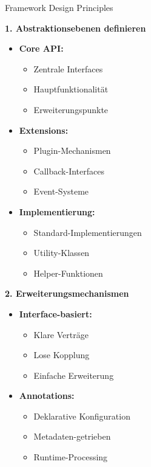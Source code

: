 \begin{corollary}{Framework Design Principles}

\begin{minipage}[t]{0.5\textwidth}
\textbf{1. Abstraktionsebenen definieren}
\begin{itemize}
    \item \textbf{Core API:}
    \begin{itemize}
        \item Zentrale Interfaces
        \item Hauptfunktionalität
        \item Erweiterungspunkte
    \end{itemize}
    
    \item \textbf{Extensions:}
    \begin{itemize}
        \item Plugin-Mechanismen
        \item Callback-Interfaces
        \item Event-Systeme
    \end{itemize}
    
    \item \textbf{Implementierung:}
    \begin{itemize}
        \item Standard-Implementierungen
        \item Utility-Klassen
        \item Helper-Funktionen
    \end{itemize}
\end{itemize}
\end{minipage}
\begin{minipage}[t]{0.5\textwidth}
\textbf{2. Erweiterungsmechanismen}
\begin{itemize}
    \item \textbf{Interface-basiert:}
    \begin{itemize}
        \item Klare Verträge
        \item Lose Kopplung
        \item Einfache Erweiterung
    \end{itemize}
    
    \item \textbf{Annotations:}
    \begin{itemize}
        \item Deklarative Konfiguration
        \item Metadaten-getrieben
        \item Runtime-Processing
    \end{itemize}
    

\end{itemize}
\end{minipage}
\end{corollary}
